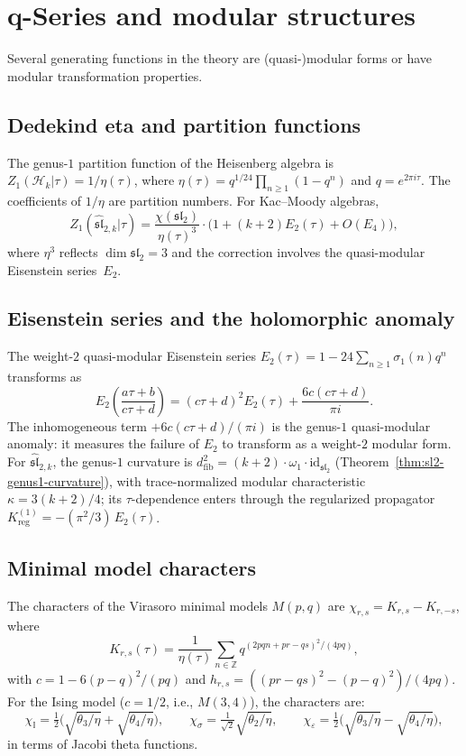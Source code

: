 \section{q-Series and modular structures}
\label{sec:q-series}

Several generating functions in the theory are (quasi-)modular forms or have modular transformation properties.

\subsection{Dedekind eta and partition functions}

The genus-$1$ partition function of the Heisenberg algebra is $Z_1(\mathcal{H}_k | \tau) = 1/\eta(\tau)$, where $\eta(\tau) = q^{1/24}\prod_{n \geq 1}(1-q^n)$ and $q = e^{2\pi i \tau}$. The coefficients of $1/\eta$ are partition numbers. For Kac--Moody algebras,
\[
Z_1(\widehat{\mathfrak{sl}}_{2,k} | \tau)
= \frac{\chi(\mathfrak{sl}_2)}{\eta(\tau)^3}
\cdot \bigl(1 + (k+2) E_2(\tau) + O(E_4)\bigr),
\]
where $\eta^3$ reflects $\dim\mathfrak{sl}_2 = 3$ and the correction involves the quasi-modular Eisenstein series~$E_2$.

\subsection{Eisenstein series and the holomorphic anomaly}

The weight-$2$ quasi-modular Eisenstein series $E_2(\tau) = 1 - 24\sum_{n \geq 1}\sigma_1(n)q^n$ transforms as
\[
E_2\!\left(\frac{a\tau+b}{c\tau+d}\right) = (c\tau+d)^2 E_2(\tau) + \frac{6c(c\tau+d)}{\pi i}.
\]
The inhomogeneous term $+6c(c\tau+d)/(\pi i)$ is the genus-$1$ quasi-modular anomaly: it measures the failure of $E_2$ to transform as a weight-$2$ modular form. For $\widehat{\mathfrak{sl}}_{2,k}$, the genus-$1$ curvature is $d_{\mathrm{fib}}^2 = (k+2) \cdot \omega_1 \cdot \mathrm{id}_{\mathfrak{sl}_2}$ (Theorem~\ref{thm:sl2-genus1-curvature}), with trace-normalized modular characteristic $\kappa = 3(k+2)/4$; its $\tau$-dependence enters through the regularized propagator $K_{\mathrm{reg}}^{(1)} = -(\pi^2/3)\,E_2(\tau)$.

\subsection{Minimal model characters}

The characters of the Virasoro minimal models $M(p,q)$ are
$\chi_{r,s} = K_{r,s} - K_{r,-s}$, where
\[
K_{r,s}(\tau)
= \frac{1}{\eta(\tau)}
\sum_{n \in \mathbb{Z}}
q^{(2pqn + pr - qs)^2/(4pq)},
\]
with $c = 1 - 6(p-q)^2/(pq)$ and $h_{r,s} = ((pr-qs)^2 - (p-q)^2)/(4pq)$. For the Ising model ($c = 1/2$, i.e., $M(3,4)$), the characters are:
\[
\chi_{\mathbb{I}} = \tfrac{1}{2}\bigl(\sqrt{\theta_3/\eta} + \sqrt{\theta_4/\eta}\bigr),
\qquad
\chi_\sigma = \tfrac{1}{\sqrt{2}}\sqrt{\theta_2/\eta},
\qquad
\chi_\varepsilon = \tfrac{1}{2}\bigl(\sqrt{\theta_3/\eta} - \sqrt{\theta_4/\eta}\bigr),
\]
in terms of Jacobi theta functions.

